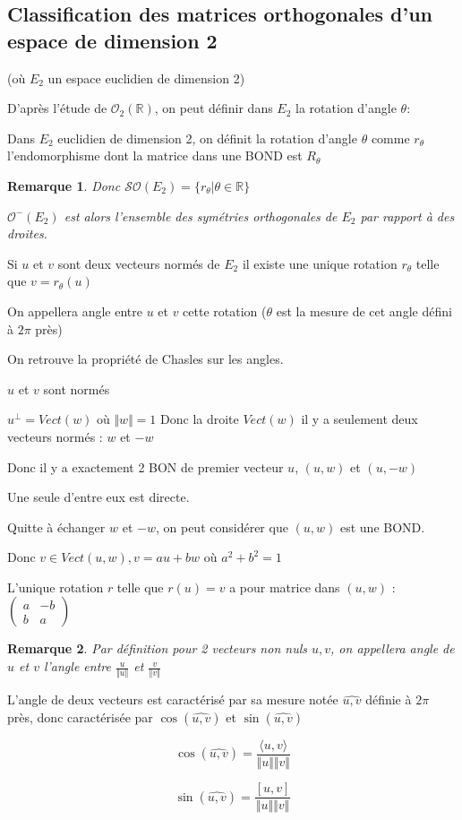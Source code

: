 \documentclass[a4paper,12pt]{book}
\newcommand{\Def}[2]{\begin{tcolorbox}[sharp corners, colback=white,colframe=blue!90!black!75, title=Définition : #1]#2\end{tcolorbox}}
\newcommand{\Prop}[2]{\begin{tcolorbox}[sharp corners, colback=white,colframe=red!90!black!75, title=Proposition : #1]#2\end{tcolorbox}}
\newcommand{\Pre}[1]{\begin{tcolorbox}[sharp corners, colback=white,colframe=green!60!green!30!black!75, title=Preuve]#1\end{tcolorbox}}
\newtheorem{Rem}{Remarque}[section]
\def\R{\mathbb{R}}
\begin{document}
\subsection{Classification des matrices orthogonales d'un espace de dimension 2}
(où $E_2$ un espace euclidien de dimension 2)
\par D'après l'étude de $\mathcal{O}_2(\R)$, on peut définir dans $E_2$ la rotation d'angle $\theta$:
\Def{}{Dans $E_2$ euclidien de dimension 2, on définit la rotation d'angle $\theta$ comme $r_\theta$ l'endomorphisme dont la matrice dans une BOND est $R_\theta$}
\begin{Rem}
Donc $\mathcal{SO}(E_2) =\{r_\theta\vert\theta\in\R\}$
\par $\mathcal{O}^-(E_2)$ est alors l'ensemble des symétries orthogonales de $E_2$ par rapport à des droites.
\end{Rem}
\Prop{}{Si $u$ et $v$ sont deux vecteurs normés de $E_2$ il existe une unique rotation $r_\theta$ telle que $v=r_\theta(u)$ 
\par On appellera angle entre $u$ et $v$ cette rotation ($\theta$ est la mesure de cet angle défini à $2\pi$ près)
\par On retrouve la propriété de Chasles sur les angles.
}
\Pre{$u$ et $v$ sont normés
\par $u^\perp=Vect(w)$ où $\Vert w \Vert=1$
Donc la droite $Vect(w)$ il y a seulement deux vecteurs normés : $w$ et $-w$ 
\par Donc il y a exactement 2 BON de premier vecteur $u$, $(u,w)$ et $(u, -w)$
\par Une seule d'entre eux est directe.
\par Quitte à échanger $w$ et $-w$, on peut considérer que $(u,w)$ est une BOND.
\par Donc $v\in Vect(u, w), v= au + bw$ où $a^2+b^2=1$
\par L'unique rotation $r$ telle que $r(u)=v$ a pour matrice dans $(u,w)$ : $\begin{pmatrix}a & -b\\ b&a\end{pmatrix}$}
\begin{Rem}
Par définition pour 2 vecteurs non nuls $u,v$, on appellera angle de $u$ et $v$ l'angle entre $\frac{u}{\Vert u\Vert}$ et $\frac{v}{\Vert v\Vert}$
\end{Rem}
\Prop{}{L'angle de deux vecteurs est caractérisé par sa mesure notée $\widehat{u, v}$ définie à $2\pi$ près, donc caractérisée par $\cos(\widehat{u,v})$ et $\sin(\widehat{u,v})$
\par $$\cos(\widehat{u,v}) = \frac{\langle u,v\rangle}{\Vert u\Vert \Vert v\Vert}$$
\par $$\sin(\widehat{u,v}) = \frac{[u,v]}{\Vert u\Vert \Vert v\Vert}$$}
\end{document}
